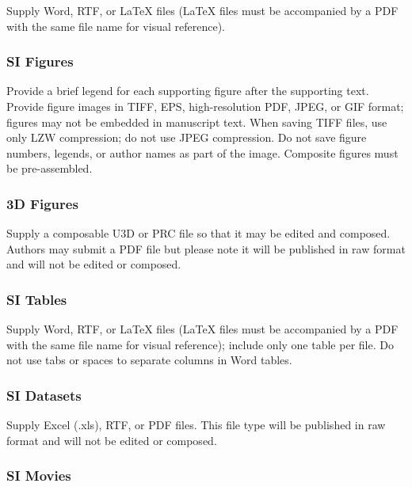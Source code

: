\documentclass[9pt,twocolumn,twoside,]{pnas-new}
\begin{document}
Supply Word, RTF, or LaTeX files (LaTeX files must be accompanied by a
PDF with the same file name for visual reference).

\subsubsection*{SI Figures}\label{si-figures}

Provide a brief legend for each supporting figure after the supporting
text. Provide figure images in TIFF, EPS, high-resolution PDF, JPEG, or
GIF format; figures may not be embedded in manuscript text. When saving
TIFF files, use only LZW compression; do not use JPEG compression. Do
not save figure numbers, legends, or author names as part of the image.
Composite figures must be pre-assembled.

\subsubsection*{3D Figures}\label{d-figures}

Supply a composable U3D or PRC file so that it may be edited and
composed. Authors may submit a PDF file but please note it will be
published in raw format and will not be edited or composed.

\subsubsection*{SI Tables}\label{si-tables}

Supply Word, RTF, or LaTeX files (LaTeX files must be accompanied by a
PDF with the same file name for visual reference); include only one
table per file. Do not use tabs or spaces to separate columns in Word
tables.

\subsubsection*{SI Datasets}\label{si-datasets}

Supply Excel (.xls), RTF, or PDF files. This file type will be published
in raw format and will not be edited or composed.

\subsubsection*{SI Movies}\label{si-movies}
\end{document}
